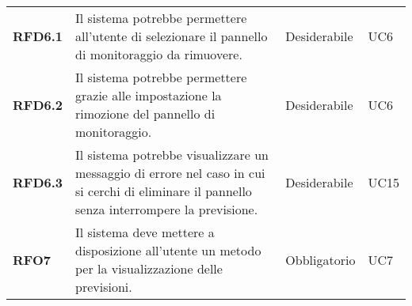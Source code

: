 \begin{longtable}[H]{>{\centering\bfseries}m{2cm} >{\centering}m{9cm} >{\centering}m{2.5cm} >{\centering\arraybackslash}m{2.5cm}}
  \textbf{RFD6.1} & Il sistema potrebbe permettere all'utente di selezionare il pannello di monitoraggio da rimuovere. & Desiderabile & UC6 \\
  \textbf{RFD6.2} & Il sistema potrebbe permettere grazie alle impostazione la rimozione del pannello di monitoraggio. & Desiderabile & UC6 \\
  \textbf{RFD6.3} & Il sistema potrebbe visualizzare un messaggio di errore nel caso in cui si cerchi di eliminare il pannello senza interrompere la previsione. & Desiderabile & UC15 \\
  \textbf{RFO7} & Il sistema deve mettere a disposizione all'utente un metodo per la visualizzazione delle previsioni. & Obbligatorio & UC7 \\


\end{longtable}

